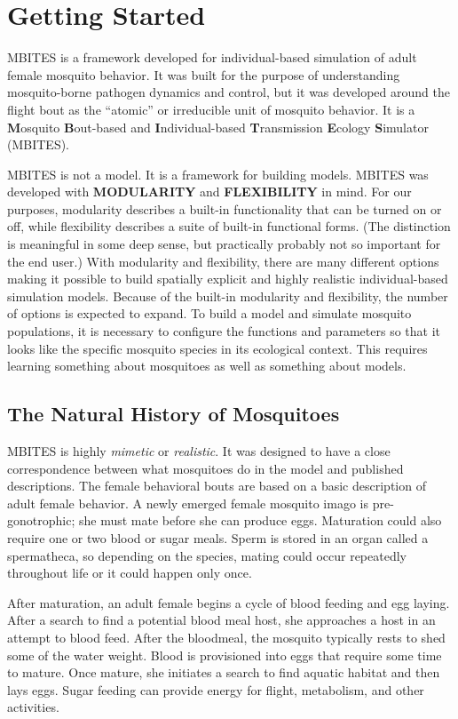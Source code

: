 \documentclass{article}
\begin{document}
\clearpage 

\section{Getting Started}

MBITES is a framework developed for individual-based simulation of adult female mosquito behavior. It was built for the purpose of understanding mosquito-borne pathogen dynamics and control, but it was developed around the flight bout as the ``atomic'' or irreducible unit of mosquito behavior. It is a {\bf M}osquito {\bf B}out-based and {\bf I}ndividual-based {\bf T}ransmission {\bf E}cology {\bf S}imulator (MBITES). 

MBITES is not a model. It is a framework for building models. MBITES was developed with {\bf MODULARITY} and {\bf FLEXIBILITY} in mind. For our purposes, modularity describes a built-in functionality that can be turned on or off, while flexibility describes a suite of built-in functional forms. (The distinction is meaningful in some deep sense, but practically probably not so important for the end user.) With modularity and flexibility, there are many different options making it possible to build spatially explicit and highly realistic individual-based simulation models. Because of the built-in modularity and flexibility, the number of options is expected to expand. To build a model and simulate mosquito populations, it is necessary to configure the functions and parameters so that it looks like the specific mosquito species in its ecological context. This requires learning something about mosquitoes as well as something about models. 

\subsection{The Natural History of Mosquitoes}

MBITES is highly {\em mimetic} or {\em realistic}. It was designed to have a close correspondence between what mosquitoes do in the model and published descriptions. The female behavioral bouts are based on a basic description of adult female behavior. A newly emerged female mosquito imago is pre-gonotrophic; she must mate before she can produce eggs. Maturation could also require one or two blood or sugar meals. Sperm is stored in an organ called a spermatheca, so depending on the species, mating could occur repeatedly throughout life or it could happen only once. 

After maturation, an adult female begins a cycle of blood feeding and egg laying. After a search to find a potential blood meal host, she approaches a host in an attempt to blood feed. After the bloodmeal, the mosquito typically rests to shed some of the water weight. Blood is provisioned into eggs that require some time to mature. Once mature, she initiates a search to find aquatic habitat and then lays eggs. Sugar feeding can provide energy for flight, metabolism, and other activities.
\end{document}
